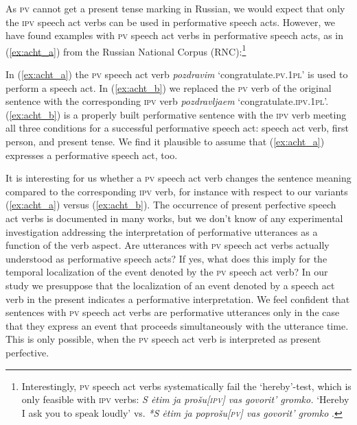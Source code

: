 \documentclass[output=paper,
colorlinks,
citecolor=brown,
newtxmath,
hidelinks
]{langscibook}
\begin{document}
As \textsc{pv} cannot get a present tense marking in Russian, we would expect that only the \textsc{ipv} speech act verbs can be used in performative speech acts. However, we have found examples with \textsc{pv} speech act verbs in performative speech acts, as in (\ref{ex:acht_a}) from the Russian National Corpus (RNC):\footnote{Interestingly, \textsc{pv} speech act verbs systematically fail the ‘hereby’-test, which is only feasible with \textsc{ipv} verbs: \textit{S ėtim ja prošu[\textsc{ipv}] vas govorit’ gromko.} ‘Hereby I ask you to speak loudly’ vs. \textit{*S ėtim ja poprošu[\textsc{pv}] vas govorit’ gromko} \citep{Eckardt2012}.}

\ea\label{ex:acht}
            \z
\z

\noindent In (\ref{ex:acht_a}) the \textsc{pv} speech act verb \textit{pozdravim} ‘congratulate\textsc{.pv.1pl}’ is used to perform a speech act. In (\ref{ex:acht_b}) we replaced the \textsc{pv} verb of the original sentence with the corresponding \textsc{ipv} verb \textit{pozdravljaem} ‘congratulate\textsc{.ipv.1pl}’. (\ref{ex:acht_b}) is a properly built performative sentence with the \textsc{ipv} verb meeting all three conditions for a successful performative speech act: speech act verb, first person, and present tense. We find it plausible to assume that (\ref{ex:acht_a}) expresses a performative speech act, too.

It is interesting for us whether a \textsc{pv} speech act verb changes the sentence meaning compared to the corresponding \textsc{ipv} verb, for instance with respect to our variants (\ref{ex:acht_a}) versus (\ref{ex:acht_b}). The occurrence of present perfective speech act verbs is documented in many works, but we don't know of any experimental investigation addressing the interpretation of performative utterances as a function of the verb aspect. Are utterances with \textsc{pv} speech act verbs actually understood as performative speech acts? If yes, what does this imply for the temporal localization of the event denoted by the \textsc{pv} speech act verb? In our study we presuppose that the localization of an event denoted by a speech act verb in the present indicates a performative interpretation. We feel confident that sentences with \textsc{pv} speech act verbs are performative utterances only in the case that they express an event that proceeds simultaneously with the utterance time. This is only possible, when the \textsc{pv} speech act verb is interpreted as present perfective.  
\end{document}
